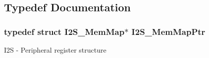 \subsection{Typedef Documentation}
\hypertarget{group___i2_s___peripheral_ga13144089ddabdfb4b30ae97b2ac9c859}{}
\subsubsection[{I2\+S\+\_\+\+Mem\+Map\+Ptr}]{\setlength{\rightskip}{0pt plus 5cm}typedef struct {\bf I2\+S\+\_\+\+Mem\+Map}$\ast$ {\bf I2\+S\+\_\+\+Mem\+Map\+Ptr}}\label{group___i2_s___peripheral_ga13144089ddabdfb4b30ae97b2ac9c859}
I2\+S -\/ Peripheral register structure 